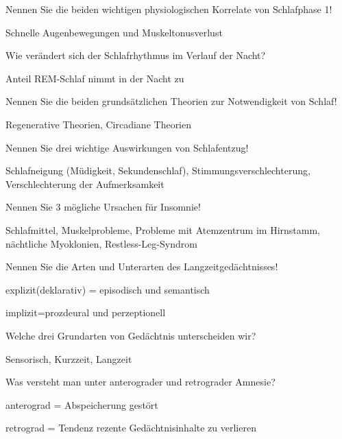 \documentclass[10pt, a4paper]{exam}
\begin{document}
\begin{questions}
  \question Nennen Sie die beiden wichtigen physiologischen Korrelate von Schlafphase 1!
  \begin{solution}
    Schnelle Augenbewegungen und Muskeltonusverlust
  \end{solution}

  \question Wie verändert sich der Schlafrhythmus im Verlauf der Nacht?
  \begin{solution}
    Anteil REM-Schlaf nimmt in der Nacht zu
  \end{solution}

  \question Nennen Sie die beiden grundsätzlichen Theorien zur Notwendigkeit von Schlaf!
  \begin{solution}
    Regenerative Theorien, Circadiane Theorien
  \end{solution}

  \question Nennen Sie drei wichtige Auswirkungen von Schlafentzug!
  \begin{solution}
    Schlafneigung (Müdigkeit, Sekundenschlaf), Stimmungsverschlechterung, Verschlechterung der Aufmerksamkeit
  \end{solution}

  \question Nennen Sie 3 mögliche Ursachen für Insomnie!
  \begin{solution}
    Schlafmittel, Muskelprobleme, Probleme mit Atemzentrum im Hirnstamm, nächtliche Myoklonien, Restless-Leg-Syndrom
  \end{solution}

  \question Nennen Sie die Arten und Unterarten des Langzeitgedächtnisses!
  \begin{solution}
    \begin{itemize*}
      \item explizit(deklarativ) = episodisch und semantisch
      \item implizit=prozdeural und perzeptionell
    \end{itemize*}
  \end{solution}

  \question Welche drei Grundarten von Gedächtnis unterscheiden wir?
  \begin{solution}
    Sensorisch, Kurzzeit, Langzeit
  \end{solution}

  \question Was versteht man unter anterograder und retrograder Amnesie?
  \begin{solution}
    \begin{itemize*}
      \item anterograd = Abspeicherung gestört
      \item retrograd = Tendenz rezente Gedächtnisinhalte zu verlieren
    \end{itemize*}
  \end{solution}


\end{questions}
\end{document}

